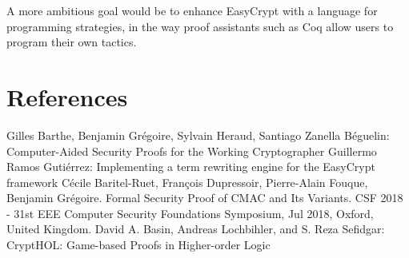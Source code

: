 \documentclass[runningheads,a4paper]{llncs}
\begin{document}
A more ambitious goal
would be to enhance EasyCrypt with a language for programming strategies, in
the way proof assistants such as Coq allow users to program their own tactics.

\section{References}

\begin{thebibliography}{4}
Gilles Barthe, Benjamin Grégoire, Sylvain Heraud, Santiago Zanella Béguelin: Computer-Aided Security Proofs
for the Working Cryptographer
Guillermo Ramos Gutiérrez: Implementing a term rewriting
engine for the EasyCrypt framework
Cécile Baritel-Ruet, François Dupressoir, Pierre-Alain Fouque, Benjamin Grégoire. Formal Security
Proof of CMAC and Its Variants. CSF 2018 - 31st EEE Computer Security Foundations Symposium,
Jul 2018, Oxford, United Kingdom.
David A. Basin, Andreas Lochbihler, and S. Reza Sefidgar: CryptHOL: Game-based Proofs in
Higher-order Logic

\end{thebibliography}
\end{document}
